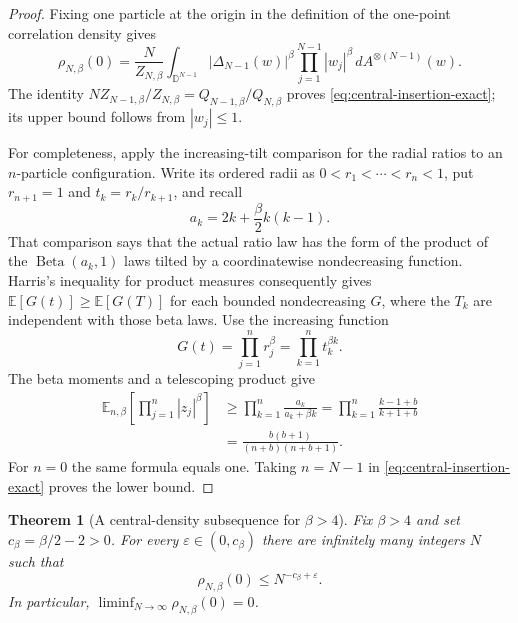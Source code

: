 \documentclass[11pt,a4paper]{article}
\numberwithin{equation}{section}
\newtheorem{theorem}{Theorem}[section]
\theoremstyle{definition}
\theoremstyle{remark}
\begin{document}
\begin{proof}
Fixing one particle at the origin in the definition of the one-point
correlation density gives
\[
 \rho_{N,\beta}(0)=\frac{N}{Z_{N,\beta}}
 \int_{\mathbb D^{N-1}}|\Delta_{N-1}(w)|^\beta
       \prod_{j=1}^{N-1}|w_j|^\beta\,dA^{\otimes(N-1)}(w).
\]
The identity $NZ_{N-1,\beta}/Z_{N,\beta}
=Q_{N-1,\beta}/Q_{N,\beta}$ proves
\eqref{eq:central-insertion-exact}; its upper bound follows from
$|w_j|\leq1$.

For completeness, apply the increasing-tilt comparison for the radial
ratios to an $n$-particle configuration.  Write its ordered radii as
$0<r_1<\cdots<r_n<1$, put $r_{n+1}=1$ and $t_k=r_k/r_{k+1}$, and recall
\[
 a_k=2k+\frac\beta2k(k-1).
\]
That comparison says that the actual ratio law has the form of the
product of the $\operatorname{Beta}(a_k,1)$ laws tilted by a
coordinatewise nondecreasing function.  Harris's inequality for product
measures consequently gives
$\mathbb E[G(t)]\geq\mathbb E[G(T)]$ for each bounded nondecreasing
$G$, where the $T_k$ are independent with those beta laws.
Use the increasing function
\[
 G(t)=\prod_{j=1}^n r_j^\beta=\prod_{k=1}^n t_k^{\beta k}.
\]
The beta moments and a telescoping product give
\begin{align*}
 \mathbb E_{n,\beta}\left[\prod_{j=1}^n|z_j|^\beta\right]
 &\geq\prod_{k=1}^n\frac{a_k}{a_k+\beta k}
 =\prod_{k=1}^n\frac{k-1+b}{k+1+b}\\
 &=\frac{b(b+1)}{(n+b)(n+b+1)}.
\end{align*}
For $n=0$ the same formula equals one.  Taking $n=N-1$ in
\eqref{eq:central-insertion-exact} proves the lower bound.
\end{proof}

\begin{theorem}[A central-density subsequence for $\beta>4$]
\label{thm:central-subsequence}
Fix $\beta>4$ and set $c_\beta=\beta/2-2>0$.  For every
$\varepsilon\in(0,c_\beta)$ there are infinitely many integers $N$ such
that
\begin{equation}
 \rho_{N,\beta}(0)\leq N^{-c_\beta+\varepsilon}.
 \label{eq:central-subsequence-rate}
\end{equation}
In particular, $\liminf_{N\to\infty}\rho_{N,\beta}(0)=0$.
\end{theorem}
\end{document}
